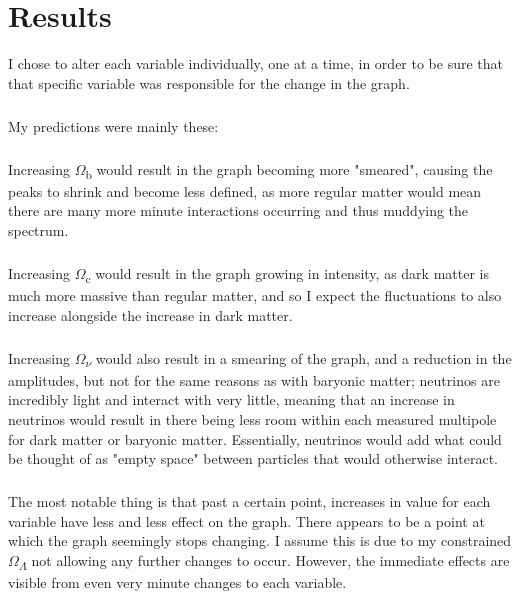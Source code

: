 \documentclass[twoside, fontsize=12pt,
     bibliography=totoc, %
     listof=totoc, %
     index=totoc, %
     onehalfspacing %
]{_MScDiss2017_cls}
\begin{document}
\chapter{Results}

I chose to alter each variable individually, one at a time, in order to be sure that that specific variable was responsible for the change in the graph.

\paragraph{}

My predictions were mainly these:
\paragraph{}
Increasing $\Omega$\textsubscript{b} would result in the graph becoming more "smeared", causing the peaks to shrink and become less defined, as more regular matter would mean there are many more minute interactions occurring and thus muddying the spectrum.
\paragraph{}
Increasing $\Omega$\textsubscript{c} would result in the graph growing in intensity, as dark matter is much more massive than regular matter, and so I expect the fluctuations to also increase alongside the increase in dark matter.
\paragraph{}
Increasing $\Omega$\textsubscript{$\nu$} would also result in a smearing of the graph, and a reduction in the amplitudes, but not for the same reasons as with baryonic matter; neutrinos are incredibly light and interact with very little, meaning that an increase in neutrinos would result in there being less room within each measured multipole for dark  matter or baryonic matter. Essentially, neutrinos would add what could be thought of as "empty space" between particles that would otherwise interact.

\paragraph{}

The most notable thing is that past a certain point, increases in value for each variable have less and less effect on the graph. There appears to be a point at which the graph seemingly stops changing. I assume this is due to my constrained $\Omega$\textsubscript{$\Lambda$} not allowing any further changes to occur. However, the immediate effects are visible from even very minute changes to each variable.
\end{document}
